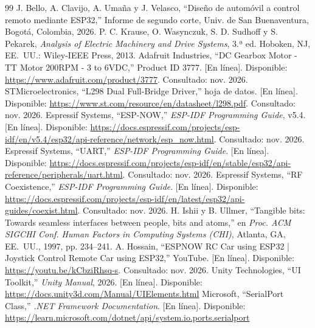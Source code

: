 \documentclass[journal]{IEEEtran}
\begin{document}
\begin{thebibliography}{99}
 J. Bello, A. Clavijo, A. Umaña y J. Velasco, ``Diseño de automóvil a control remoto mediante ESP32,'' Informe de segundo corte, Univ. de San Buenaventura, Bogotá, Colombia, 2026.
 P. C. Krause, O. Wasynczuk, S. D. Sudhoff y S. Pekarek, \emph{Analysis of Electric Machinery and Drive Systems}, 3.ª ed. Hoboken, NJ, EE.~UU.: Wiley-IEEE Press, 2013.
 Adafruit Industries, ``DC Gearbox Motor - TT Motor 200RPM - 3 to 6VDC,'' Product ID 3777. [En línea]. Disponible: \url{https://www.adafruit.com/product/3777}. Consultado: nov. 2026.
 STMicroelectronics, ``L298 Dual Full-Bridge Driver,'' hoja de datos. [En línea]. Disponible: \url{https://www.st.com/resource/en/datasheet/l298.pdf}. Consultado: nov. 2026.
 Espressif Systems, ``ESP-NOW,'' \emph{ESP-IDF Programming Guide}, v5.4. [En línea]. Disponible: \url{https://docs.espressif.com/projects/esp-idf/en/v5.4/esp32/api-reference/network/esp_now.html}. Consultado: nov. 2026.
 Espressif Systems, ``UART,'' \emph{ESP-IDF Programming Guide}. [En línea]. Disponible: \url{https://docs.espressif.com/projects/esp-idf/en/stable/esp32/api-reference/peripherals/uart.html}. Consultado: nov. 2026.
 Espressif Systems, ``RF Coexistence,'' \emph{ESP-IDF Programming Guide}. [En línea]. Disponible: \url{https://docs.espressif.com/projects/esp-idf/en/latest/esp32/api-guides/coexist.html}. Consultado: nov. 2026.
 H. Ishii y B. Ullmer, ``Tangible bits: Towards seamless interfaces between people, bits and atoms,'' en \emph{Proc. ACM SIGCHI Conf. Human Factors in Computing Systems (CHI)}, Atlanta, GA, EE.~UU., 1997, pp. 234--241.
 A. Hossain, ``ESPNOW RC Car using ESP32 | Joystick Control Remote Car using ESP32,'' YouTube. [En línea]. Disponible: \url{https://youtu.be/kCbziRhsq-s}. Consultado: nov. 2026.
 Unity Technologies, ``UI Toolkit,'' \emph{Unity Manual}, 2026. [En línea]. Disponible: \url{https://docs.unity3d.com/Manual/UIElements.html}
 Microsoft, ``SerialPort Class,'' \emph{.NET Framework Documentation}. [En línea]. Disponible: \url{https://learn.microsoft.com/dotnet/api/system.io.ports.serialport}
\end{thebibliography}
\end{document}
